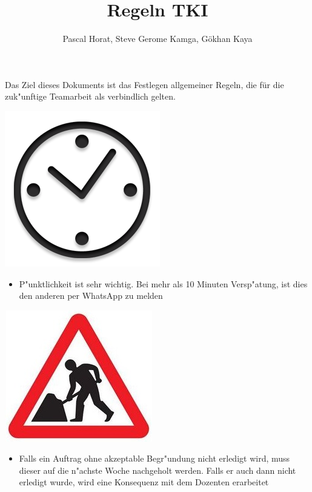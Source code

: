 \documentclass[12pt]{article}
\title{Regeln TKI}
\author{Pascal Horat, Steve Gerome Kamga, Gökhan Kaya}
\begin{document}
\maketitle

Das Ziel dieses Dokuments ist das Festlegen allgemeiner Regeln, die für die zuk"unftige Teamarbeit als verbindlich gelten.\\

\begin{center}
\includegraphics[scale=0.25]{clock}\\
\end{center}


\begin{itemize}
\item P"unktlichkeit ist sehr wichtig. Bei mehr als 10 Minuten Versp"atung, ist dies den anderen per WhatsApp zu melden
\end{itemize}

\begin{center}
\includegraphics[scale=1.1]{work}\\
\end{center}

\begin{itemize}
\item Falls ein Auftrag ohne akzeptable Begr"undung nicht erledigt wird, muss dieser auf die n"achste Woche nachgeholt werden. Falls er auch dann nicht erledigt wurde, wird eine Konsequenz mit dem Dozenten erarbeitet
\end{itemize}
\end{document}
